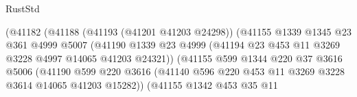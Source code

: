 \begin{lexlean}{RustStd}
\begin{coremodule}
                                    (@41182
                                      (@41188
                                        (@41193 (@41201 @41203 @24298))
                                        (@41155
                                          @1339
                                          @1345
                                          @23
                                          @361
                                          @4999
                                          @5007
                                          (@41190
                                            @1339
                                            @23
                                            @4999
                                            (@41194
                                              @23
                                              @453
                                              @11
                                              @3269
                                              @3228
                                              @4997
                                              @14065
                                              @41203
                                              @24321))
                                          (@41155
                                            @599
                                            @1344
                                            @220
                                            @37
                                            @3616
                                            @5006
                                            (@41190
                                              @599
                                              @220
                                              @3616
                                              (@41140
                                                @596
                                                @220
                                                @453
                                                @11
                                                @3269
                                                @3228
                                                @3614
                                                @14065
                                                @41203
                                                @15282))
                                            (@41155
                                              @1342
                                              @453
                                              @35
                                              @11

\end{coremodule}
\end{lexlean}
